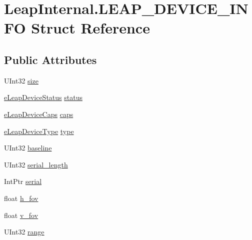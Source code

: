 \hypertarget{struct_leap_internal_1_1_l_e_a_p___d_e_v_i_c_e___i_n_f_o}{}\section{Leap\+Internal.\+L\+E\+A\+P\+\_\+\+D\+E\+V\+I\+C\+E\+\_\+\+I\+N\+FO Struct Reference}
\label{struct_leap_internal_1_1_l_e_a_p___d_e_v_i_c_e___i_n_f_o}
\subsection*{Public Attributes}
\begin{DoxyCompactItemize}
\item 
U\+Int32 \mbox{\hyperlink{struct_leap_internal_1_1_l_e_a_p___d_e_v_i_c_e___i_n_f_o_a6a8670a1df9cdc6ff7f488db60b89d42}{size}}
\item 
\mbox{\hyperlink{namespace_leap_internal_a16b28ea79f39b6205c514b3e9b075bed}{e\+Leap\+Device\+Status}} \mbox{\hyperlink{struct_leap_internal_1_1_l_e_a_p___d_e_v_i_c_e___i_n_f_o_ac26d4e34e11cdf992fcb186b5d15651e}{status}}
\item 
\mbox{\hyperlink{namespace_leap_internal_abaf362ab57323da251a6eb1444092a4b}{e\+Leap\+Device\+Caps}} \mbox{\hyperlink{struct_leap_internal_1_1_l_e_a_p___d_e_v_i_c_e___i_n_f_o_af8cc7270f40fa5cf62e57805d3fdfb4a}{caps}}
\item 
\mbox{\hyperlink{namespace_leap_internal_a2f134f9672b8f6ded5ec9979abc7fe91}{e\+Leap\+Device\+Type}} \mbox{\hyperlink{struct_leap_internal_1_1_l_e_a_p___d_e_v_i_c_e___i_n_f_o_a984ede18202cab13176d650a5f14254e}{type}}
\item 
U\+Int32 \mbox{\hyperlink{struct_leap_internal_1_1_l_e_a_p___d_e_v_i_c_e___i_n_f_o_a43bdbede932c1a20e1a19a208fc2908a}{baseline}}
\item 
U\+Int32 \mbox{\hyperlink{struct_leap_internal_1_1_l_e_a_p___d_e_v_i_c_e___i_n_f_o_ae86ff790599c8a97d23abfc932ec6f66}{serial\+\_\+length}}
\item 
Int\+Ptr \mbox{\hyperlink{struct_leap_internal_1_1_l_e_a_p___d_e_v_i_c_e___i_n_f_o_a60db596918d7743e92b731bffab6ed83}{serial}}
\item 
float \mbox{\hyperlink{struct_leap_internal_1_1_l_e_a_p___d_e_v_i_c_e___i_n_f_o_a89742fadc2f54f93e08468ddcab7e752}{h\+\_\+fov}}
\item 
float \mbox{\hyperlink{struct_leap_internal_1_1_l_e_a_p___d_e_v_i_c_e___i_n_f_o_a016427490d1620736aa7c2c379378e15}{v\+\_\+fov}}
\item 
U\+Int32 \mbox{\hyperlink{struct_leap_internal_1_1_l_e_a_p___d_e_v_i_c_e___i_n_f_o_a38338c0df7d385d3b73f3bbb2bc963f9}{range}}
\end{DoxyCompactItemize}


